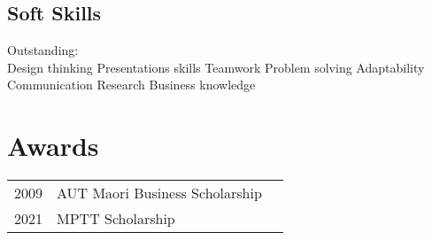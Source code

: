 \documentclass[]{deedy-resume-openfont}
\begin{document}
\begin{minipage}[t]{3.2in}
\subsection{Soft Skills}
Outstanding: \\
\textbullet{}Design thinking \textbullet{}Presentations skills \textbullet{}Teamwork \textbullet{}Problem solving
 \textbullet{}Adaptability \textbullet{}Communication
\textbullet{}Research \textbullet{}Business knowledge
\sectionsep


\section{Awards} 
\begin{tabular}{rll}
2009	     & AUT Maori Business Scholarship  \\
2021	     & MPTT Scholarship  \\

\end{tabular}
\sectionsep
%
%

\end{minipage} 
\hfill
\end{document}
